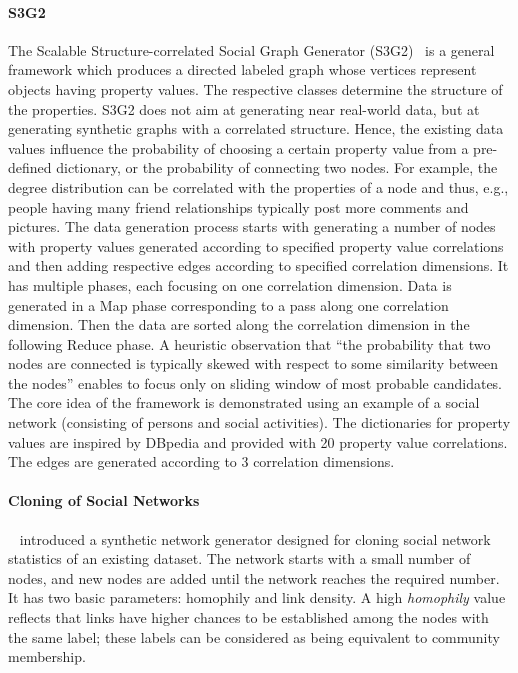 \paragraph{S3G2} The Scalable Structure-correlated Social Graph Generator (S3G2)~\cite{Pham2013} is a general framework which produces a directed labeled graph whose vertices represent objects having property values. The respective classes determine the structure of the properties. S3G2 does not aim at generating near real-world data, but at generating synthetic graphs with a correlated structure. Hence, the existing data values influence the probability of choosing a certain property value from a pre-defined dictionary, or the probability of connecting two nodes. For example, the degree distribution can be correlated with the properties of a node and thus, e.g., people having many friend relationships typically post more comments and pictures. The data generation process starts with generating a number of nodes with property values generated according to specified property value correlations and then adding respective edges according to specified correlation dimensions. It has multiple phases, each focusing on one correlation dimension. Data is generated in a Map phase corresponding to a pass along one correlation dimension. Then the data are sorted along the correlation dimension in the following Reduce phase. A heuristic observation that ``the probability that two nodes are connected is typically skewed with respect to some similarity between the nodes'' enables to focus only on sliding window of most probable candidates. The core idea of the framework is demonstrated using an example of a social network (consisting of persons and social activities).  The dictionaries for property values are inspired by DBpedia and provided with 20 property value correlations. The edges are generated according to 3 correlation dimensions.


\paragraph{Cloning of Social Networks} ~\cite{Sukthankar-SocialInfo2014}
introduced a synthetic network generator designed for cloning social network
statistics of an existing dataset. The network starts with a small number of
nodes, and new nodes are added until the network reaches the required number. It
has two basic parameters: homophily and link density. A high \emph{homophily}
value reflects that links have higher chances to be established among the nodes with the
same label; these labels can be considered as being equivalent to community
membership.

